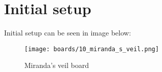 \section*{Initial setup}

Initial setup can be seen in image below:

\noindent
\begin{figure}[h]
\texttt{[image: boards/10\_miranda\_s\_veil.png]}
\caption{Miranda's veil board}
\label{fig:10_miranda_s_veil}
\end{figure}

\clearpage %
